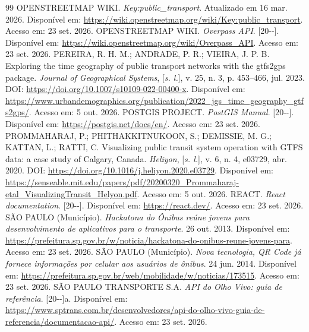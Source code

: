 \documentclass[12pt,oneside,a4paper,brazil,chapter=TITLE]{abntex2}
\begin{document}
\begin{thebibliography}{99}
 OPENSTREETMAP WIKI. \textit{Key:public\_transport}. Atualizado em 16 mar. 2026. Disponível em: \url{https://wiki.openstreetmap.org/wiki/Key:public_transport}. Acesso em: 23 set. 2026.
 OPENSTREETMAP WIKI. \textit{Overpass API}. [20\mbox{-}\mbox{-}]. Disponível em: \url{https://wiki.openstreetmap.org/wiki/Overpass_API}. Acesso em: 23 set. 2026.
 PEREIRA, R. H. M.; ANDRADE, P. R.; VIEIRA, J. P. B. Exploring the time geography of public transport networks with the gtfs2gps package. \textit{Journal of Geographical Systems}, [\textit{s. l.}], v. 25, n. 3, p. 453--466, jul. 2023. DOI: \url{https://doi.org/10.1007/s10109-022-00400-x}. Disponível em: \url{https://www.urbandemographics.org/publication/2022_jgs_time_geography_gtfs2gps/}. Acesso em: 5 out. 2026.
 POSTGIS PROJECT. \textit{PostGIS Manual}. [20\mbox{-}\mbox{-}]. Disponível em: \url{https://postgis.net/docs/en/}. Acesso em: 23 set. 2026.
 PROMMAHARAJ, P.; PHITHAKKITNUKOON, S.; DEMISSIE, M. G.; KATTAN, L.; RATTI, C. Visualizing public transit system operation with GTFS data: a case study of Calgary, Canada. \textit{Heliyon}, [\textit{s. l.}], v. 6, n. 4, e03729, abr. 2020. DOI: \url{https://doi.org/10.1016/j.heliyon.2020.e03729}. Disponível em: \url{https://senseable.mit.edu/papers/pdf/20200320_Prommaharaj-etal_VisualizingTransit_Helyon.pdf}. Acesso em: 5 out. 2026.
 REACT. \textit{React documentation}. [20\mbox{-}\mbox{-}]. Disponível em: \url{https://react.dev/}. Acesso em: 23 set. 2026.
 SÃO PAULO (Município). \textit{Hackatona do Ônibus reúne jovens para desenvolvimento de aplicativos para o transporte}. 26 out. 2013. Disponível em: \url{https://prefeitura.sp.gov.br/w/noticia/hackatona-do-onibus-reune-jovens-para}. Acesso em: 23 set. 2026.
 SÃO PAULO (Município). \textit{Nova tecnologia, QR Code já fornece informações por celular aos usuários de ônibus}. 24 jun. 2014. Disponível em: \url{https://prefeitura.sp.gov.br/web/mobilidade/w/noticias/173515}. Acesso em: 23 set. 2026.
 SÃO PAULO TRANSPORTE S.A. \textit{API do Olho Vivo: guia de referência}. [20\mbox{-}\mbox{-}]a. Disponível em: \url{https://www.sptrans.com.br/desenvolvedores/api-do-olho-vivo-guia-de-referencia/documentacao-api/}. Acesso em: 23 set. 2026.

\end{thebibliography}
\end{document}
